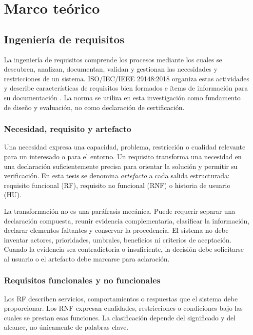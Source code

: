 \chapter{Marco teórico}
\label{cap:marco-teorico}

\section{Ingeniería de requisitos}

La ingeniería de requisitos comprende los procesos mediante los cuales se descubren, analizan, documentan, validan y gestionan las necesidades y restricciones de un sistema. ISO/IEC/IEEE 29148:2018 organiza estas actividades y describe características de requisitos bien formados e ítems de información para su documentación \cite{iso29148}. La norma se utiliza en esta investigación como fundamento de diseño y evaluación, no como declaración de certificación.

\subsection{Necesidad, requisito y artefacto}

Una necesidad expresa una capacidad, problema, restricción o cualidad relevante para un interesado o para el entorno. Un requisito transforma una necesidad en una declaración suficientemente precisa para orientar la solución y permitir su verificación. En esta tesis se denomina \emph{artefacto} a cada salida estructurada: requisito funcional (RF), requisito no funcional (RNF) o historia de usuario (HU).

La transformación no es una paráfrasis mecánica. Puede requerir separar una declaración compuesta, reunir evidencia complementaria, clasificar la información, declarar elementos faltantes y conservar la procedencia. El sistema no debe inventar actores, prioridades, umbrales, beneficios ni criterios de aceptación. Cuando la evidencia sea contradictoria o insuficiente, la decisión debe solicitarse al usuario o el artefacto debe marcarse para aclaración.

\subsection{Requisitos funcionales y no funcionales}

Los RF describen servicios, comportamientos o respuestas que el sistema debe proporcionar. Los RNF expresan cualidades, restricciones o condiciones bajo las cuales se prestan esas funciones. La clasificación depende del significado y del alcance, no únicamente de palabras clave.


